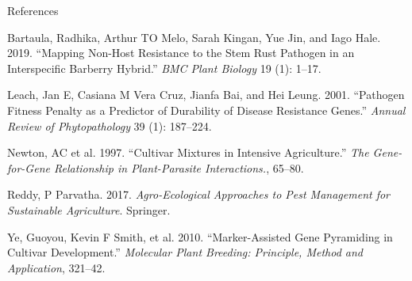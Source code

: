 \documentclass[11pt,dvipsnames,ignorenonframetext,aspectratio=169]{beamer}
\newenvironment{CSLReferences}%
  {}%
  {\par}
\begin{document}
\begin{frame}[allowframebreaks]{References}
\protect\hypertarget{references}{}
\footnotesize

\hypertarget{refs}{}
\begin{CSLReferences}{1}{0}
\leavevmode{}%
Bartaula, Radhika, Arthur TO Melo, Sarah Kingan, Yue Jin, and Iago Hale.
2019. {``Mapping Non-Host Resistance to the Stem Rust Pathogen in an
Interspecific Barberry Hybrid.''} \emph{BMC Plant Biology} 19 (1):
1--17.

\leavevmode{}%
Leach, Jan E, Casiana M Vera Cruz, Jianfa Bai, and Hei Leung. 2001.
{``Pathogen Fitness Penalty as a Predictor of Durability of Disease
Resistance Genes.''} \emph{Annual Review of Phytopathology} 39 (1):
187--224.

\leavevmode{}%
Newton, AC et al. 1997. {``Cultivar Mixtures in Intensive
Agriculture.''} \emph{The Gene-for-Gene Relationship in Plant-Parasite
Interactions.}, 65--80.

\leavevmode{}%
Reddy, P Parvatha. 2017. \emph{Agro-Ecological Approaches to Pest
Management for Sustainable Agriculture}. Springer.

\leavevmode{}%
Ye, Guoyou, Kevin F Smith, et al. 2010. {``Marker-Assisted Gene
Pyramiding in Cultivar Development.''} \emph{Molecular Plant Breeding:
Principle, Method and Application}, 321--42.

\end{CSLReferences}
\end{frame}
\end{document}
